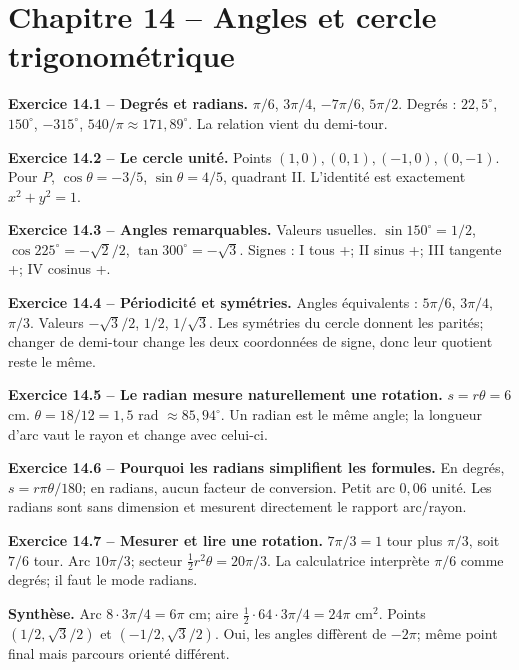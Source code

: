 \documentclass[11pt,a4paper,openany]{book}
\begin{document}
\chapter*{Chapitre 14 -- Angles et cercle trigonométrique}
\begin{answerbox}
\textbf{Exercice 14.1 -- Degrés et radians.} $\pi/6$, $3\pi/4$, $-7\pi/6$, $5\pi/2$. Degrés : $22{,}5^\circ$, $150^\circ$, $-315^\circ$, $540/\pi\approx171{,}89^\circ$. La relation vient du demi-tour.\par
\textbf{Exercice 14.2 -- Le cercle unité.} Points $(1,0),(0,1),(-1,0),(0,-1)$. Pour $P$, $\cos\theta=-3/5$, $\sin\theta=4/5$, quadrant II. L'identité est exactement $x^2+y^2=1$.\par
\textbf{Exercice 14.3 -- Angles remarquables.} Valeurs usuelles. $\sin150^\circ=1/2$, $\cos225^\circ=-\sqrt2/2$, $\tan300^\circ=-\sqrt3$. Signes : I tous +; II sinus +; III tangente +; IV cosinus +.\par
\textbf{Exercice 14.4 -- Périodicité et symétries.} Angles équivalents : $5\pi/6$, $3\pi/4$, $\pi/3$. Valeurs $-\sqrt3/2$, $1/2$, $1/\sqrt3$. Les symétries du cercle donnent les parités; changer de demi-tour change les deux coordonnées de signe, donc leur quotient reste le même.\par
\textbf{Exercice 14.5 -- Le radian mesure naturellement une rotation.} $s=r\theta=6$ cm. $\theta=18/12=1{,}5$ rad $\approx85{,}94^\circ$. Un radian est le même angle; la longueur d'arc vaut le rayon et change avec celui-ci.\par
\textbf{Exercice 14.6 -- Pourquoi les radians simplifient les formules.} En degrés, $s=r\pi\theta/180$; en radians, aucun facteur de conversion. Petit arc $0{,}06$ unité. Les radians sont sans dimension et mesurent directement le rapport arc/rayon.\par
\textbf{Exercice 14.7 -- Mesurer et lire une rotation.} $7\pi/3=1$ tour plus $\pi/3$, soit $7/6$ tour. Arc $10\pi/3$; secteur $\frac12r^2\theta=20\pi/3$. La calculatrice interprète $\pi/6$ comme degrés; il faut le mode radians.\par
\medskip\textbf{Synthèse.} Arc $8\cdot3\pi/4=6\pi$ cm; aire $\frac12\cdot64\cdot3\pi/4=24\pi$ cm$^2$. Points $(1/2,\sqrt3/2)$ et $(-1/2,\sqrt3/2)$. Oui, les angles diffèrent de $-2\pi$; même point final mais parcours orienté différent.
\end{answerbox}
\end{document}
